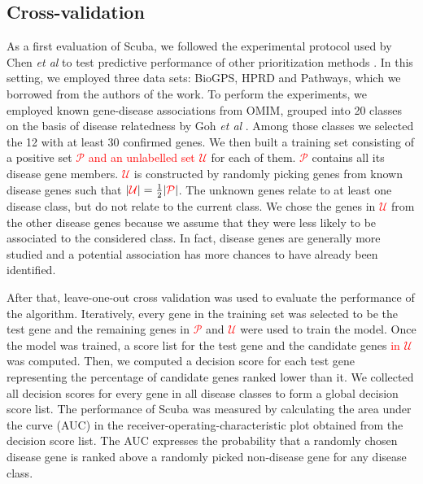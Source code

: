 \documentclass[twocolumn]{bmcart}%
\begin{document}
\subsection*{Cross-validation}
As a first evaluation of Scuba, we followed the experimental protocol used by Chen \emph{et al} to test predictive performance of other prioritization methods \cite{f3pc}. In this setting, we employed three data sets: BioGPS, HPRD and Pathways, which we borrowed from the authors of the work. To perform the experiments, we employed known gene-disease associations from OMIM, grouped into 20 classes on the basis of disease relatedness by Goh \emph{et al} \cite{goh}. Among those classes we selected the 12 with at least 30 confirmed genes. We then built a training set consisting of a positive set \textcolor{red}{$\mathcal{P}$ and an unlabelled set $\mathcal{U}$} for each of them. \textcolor{red}{$\mathcal{P}$} contains all its disease gene members. \textcolor{red}{$\mathcal{U}$} is constructed by randomly picking genes from known disease genes such that $\vert \textcolor{red}{\mathcal{U}} \vert = \frac{1}{2} \vert \textcolor{red}{\mathcal{P}} \vert$. The unknown genes relate to at least one disease class, but do not relate to the current class. We chose the genes in \textcolor{red}{$\mathcal{U}$} from the other disease genes because we assume that they were less likely to be associated to the considered class. In fact, disease genes are generally more studied and a potential association has more chances to have already been identified.

After that, leave-one-out cross validation was used to evaluate the performance of the algorithm. Iteratively, every gene in the training set was selected to be the test gene and the remaining genes in \textcolor{red}{$\mathcal{P}$} and \textcolor{red}{$\mathcal{U}$} were used to train the model. Once the model was trained, a score list for the test gene and the candidate genes \textcolor{red}{in $\mathcal{U}$} was computed. Then, we computed a decision score for each test gene representing the percentage of candidate genes ranked lower than it. We collected all decision scores for every gene in all disease classes to form a global decision score list. The performance of Scuba was measured by calculating the area under the curve (AUC) in the receiver-operating-characteristic plot obtained from the decision score list. The AUC expresses the probability that a randomly chosen disease gene is ranked above a randomly picked non-disease gene for any disease class.
\end{document}
